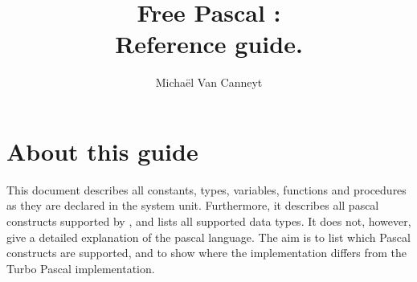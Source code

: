 %
%
%
%
%

\begin{latexonly}
  \ifpdf
  \fi
\end{latexonly}

%
%
\makeindex
%
%
\usepackage{syntax}

%
%

\renewcommand{\hline}{\xspace}
\title{Free Pascal :\\ Reference guide.}

\author{Micha\"el Van Canneyt}
\maketitle
\tableofcontents
\newpage
\listoftables
\newpage




\section*{About this guide}
This document describes all constants, types, variables, functions and
procedures as they are declared in the system unit.
Furthermore, it describes all pascal constructs supported by \fpc, and lists
all supported data types. It does not, however, give a detailed explanation
of the pascal language. The aim is to list which Pascal constructs are
supported, and to show where the \fpc implementation differs from the
Turbo Pascal implementation.
